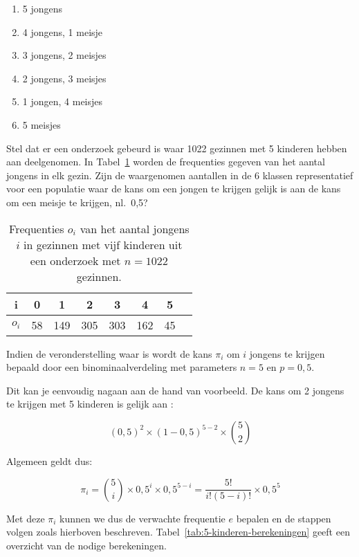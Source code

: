 \begin{enumerate}
  \item 5 jongens
  \item 4 jongens, 1 meisje
  \item 3 jongens, 2 meisjes
  \item 2 jongens, 3 meisjes
  \item 1 jongen, 4 meisjes
  \item 5 meisjes
\end{enumerate}

Stel dat er een onderzoek gebeurd is waar 1022 gezinnen met 5 kinderen hebben aan deelgenomen. In Tabel~\ref{tab:5-kinderen} worden de frequenties gegeven van het aantal jongens in elk gezin. Zijn de waargenomen aantallen in de 6 klassen representatief voor een populatie waar de kans om een jongen te krijgen gelijk is aan de kans om een meisje te krijgen, nl.~0,5?

\begin{table}
  \centering
  \begin{tabular}{@{}cccccccc@{}}
    \toprule
    i       & 0  & 1   & 2   & 3   & 4   & 5  &  \\
    \midrule
    $o_{i}$ & 58 & 149 & 305 & 303 & 162 & 45 &  \\
    \bottomrule
  \end{tabular}
  \caption{Frequenties $o_i$ van het aantal jongens $i$ in gezinnen met vijf kinderen uit een onderzoek met $n = 1022$ gezinnen.}
  \label{tab:5-kinderen}
\end{table}

Indien de veronderstelling waar is wordt de kans $\pi_{i}$ om $i$ jongens te krijgen bepaald door een binominaalverdeling met parameters $n=5$ en $p=0,5$.

Dit kan je eenvoudig nagaan aan de hand van voorbeeld. De kans om 2 jongens te krijgen met 5 kinderen is gelijk aan :

\[ (0,5)^{2} \times (1-0,5)^{5-2} \times \binom{5}{2} \]

Algemeen geldt dus:

\[ \pi_{i} = \binom{5}{i}\times 0,5^{i} \times 0,5^{5-i} = \frac{5!}{i!(5-i)!}\times 0,5^{5} \]

Met deze $\pi_{i}$ kunnen we dus de verwachte frequentie $e$ bepalen en de stappen volgen zoals hierboven beschreven. Tabel~\ref{tab:5-kinderen-berekeningen} geeft een overzicht van de nodige berekeningen.

